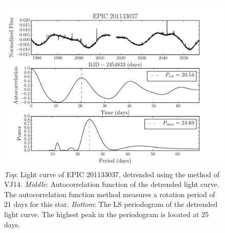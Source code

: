 \begin{figure}
\begin{center}
\includegraphics[width=6in, clip=true]{figures/rotation201133037.pdf}
\caption{{\it Top}: Light curve of EPIC 201133037, detrended using the method
	of VJ14.
	{\it Middle}: Autocorrelation function of the detrended light
	curve. The autocorrelation function method measures a rotation period
	of 21 days for this star.
	{\it Bottom}: The LS periodogram of the detrended light curve.
	The highest peak in the periodogram is located at 25 days.}
\label{fig:rotation_poster_child}
\end{center}
\end{figure}

